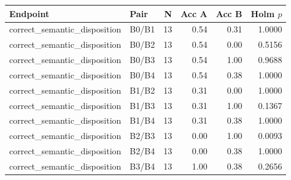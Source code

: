 \begin{tabular}{llrrrr}
\toprule
Endpoint & Pair & N & Acc A & Acc B & Holm $p$ \\
\midrule
correct_semantic_disposition & B0/B1 & 13 & 0.54 & 0.31 & 1.0000 \\
correct_semantic_disposition & B0/B2 & 13 & 0.54 & 0.00 & 0.5156 \\
correct_semantic_disposition & B0/B3 & 13 & 0.54 & 1.00 & 0.9688 \\
correct_semantic_disposition & B0/B4 & 13 & 0.54 & 0.38 & 1.0000 \\
correct_semantic_disposition & B1/B2 & 13 & 0.31 & 0.00 & 1.0000 \\
correct_semantic_disposition & B1/B3 & 13 & 0.31 & 1.00 & 0.1367 \\
correct_semantic_disposition & B1/B4 & 13 & 0.31 & 0.38 & 1.0000 \\
correct_semantic_disposition & B2/B3 & 13 & 0.00 & 1.00 & 0.0093 \\
correct_semantic_disposition & B2/B4 & 13 & 0.00 & 0.38 & 1.0000 \\
correct_semantic_disposition & B3/B4 & 13 & 1.00 & 0.38 & 0.2656 \\
\bottomrule
\end{tabular}
